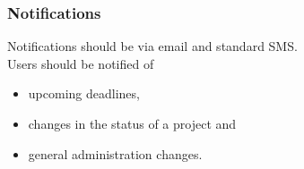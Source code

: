 \subsubsection{Notifications}
Notifications should be via email and standard SMS.\\
Users should be notified of
\begin{itemize}
	\item upcoming deadlines,
	\item changes in the status of a project and
	\item general administration changes.
\end{itemize}

